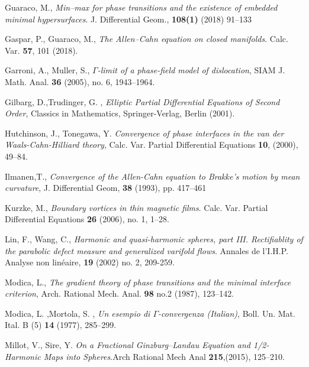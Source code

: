 \begin{thebibliography}{9}
Guaraco, M., \textit{Min–max for phase transitions and the existence of embedded minimal hypersurfaces}.
J. Differential Geom., \textbf{108(1)} (2018) 91–133

Gaspar, P., Guaraco, M., \textit{The Allen–Cahn equation on closed manifolds}. Calc. Var. \textbf{57}, 101 (2018).

Garroni, A., Muller, S., \textit{$\Gamma$-limit of a phase-field model of dislocation}, SIAM J. Math. Anal.
\textbf{36} (2005), no. 6, 1943–1964.

Gilbarg, D.,Trudinger, G. , \textit{Elliptic Partial Differential Equations of Second Order}, Classics in Mathematics, Springer-Verlag,
Berlin (2001).

Hutchinson, J., Tonegawa, Y.  \textit{Convergence of phase interfaces in the van der Waals-Cahn-Hilliard theory}, Calc. Var. Partial Differential Equations \textbf{10}, (2000), 49–84.

 Ilmanen,T., \textit{Convergence of the Allen-Cahn equation to Brakke’s motion by mean
curvature}, J. Differential Geom, \textbf{38} (1993), pp. 417–461

Kurzke, M., \textit{Boundary vortices in thin magnetic films}. Calc. Var. Partial Differential Equations
\textbf{26} (2006), no. 1, 1–28.

Lin, F., Wang, C.,  \textit{Harmonic and quasi-harmonic spheres, part III. Rectifiablity of the parabolic defect measure and generalized varifold flows}. Annales de l'I.H.P. Analyse non linéaire, \textbf{ 19} (2002) no. 2, 209-259.

Modica, L., \textit{The gradient theory of phase transitions and the minimal interface criterion}, Arch. Rational Mech. Anal. \textbf{98} no.2 (1987), 123–142.

Modica, L. ,Mortola, S. , \textit{Un esempio di $\Gamma$-convergenza (Italian)}, Boll. Un. Mat. Ital. B (5)
\textbf{14 }(1977), 285–299.

Millot, V., Sire, Y. \textit{On a Fractional Ginzburg–Landau Equation and 1/2-Harmonic Maps into Spheres}.Arch Rational Mech Anal \textbf{215},(2015), 125–210. 


\end{thebibliography}

